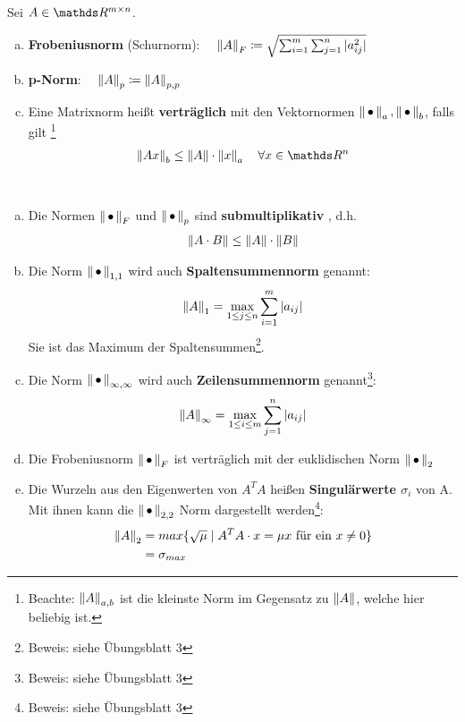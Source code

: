\begin{Defe}
  \label{3.2.5}
  Sei $A\in \R^{m\times n}$.
  \begin{enumerate}[a)]
  \item \textbf{Frobeniusnorm} (Schurnorm):
    $ \quad \nn[A]_F \coloneqq \sqrt{\sum_{i=1}^{m}\sum_{j=1}^{n}|a_{ij}^2|}
    \index{Norm!Frobeniusnorm}$
  \item \textbf{p-Norm}: 
    $\quad \nn[A]_p \coloneqq \nn[A]_{p,p}
    \index{p-Norm}$
  \item Eine Matrixnorm heißt \textbf{verträglich}  mit den Vektornormen 
    $\nn_a, \nn_b$, falls gilt
    \footnote{ Beachte: $\nn[A]_{a,b}$ ist die kleinste Norm im Gegensatz zu $\nn[A]$, welche hier beliebig ist.}
    \begin{gather*}
      \nn[Ax]_b \leq \nn[A]\cdot \nn[x]_a \quad \forall x\in \R^n
    \end{gather*}
  \end{enumerate}
\end{Defe}
\begin{Beme}~
  \label{3.2.6}
  \begin{enumerate}[a)]
  \item Die Normen $\nn_F$ und $\nn_p$ sind \textbf{submultiplikativ} , d.h.
    \begin{gather*}
      \nn[A\cdot B] \leq \nn[A]\cdot\nn[B]
    \end{gather*}
  \item Die Norm $\nn_{1,1}$ wird auch \textbf{Spaltensummennorm} genannt:
    \begin{gather*}
      \nn[A]_1 = \max_{1\leq j \leq n}\sum_{i=1}^{m}|a_{ij}|
    \end{gather*}
    Sie ist das Maximum der Spaltensummen\footnote{Beweis: siehe Übungsblatt 3}.
  \item Die Norm $\nn_{\infty, \infty}$ wird auch \textbf{Zeilensummennorm} 
    genannt\footnote{Beweis: siehe Übungsblatt 3}:
    \begin{gather*}
      \nn[A]_\infty = \max_{1\leq i \leq m}\sum_{j=1}^{n}|a_{ij}|
    \end{gather*}
  \item Die Frobeniusnorm $\nn_F$ ist verträglich mit der euklidischen Norm $\nn_2$
  \item Die Wurzeln aus den Eigenwerten von $A^TA$ heißen \textbf{Singulärwerte $\sigma_i$}  von A.
    Mit ihnen kann die $\nn_{2,2}$ Norm dargestellt werden\footnote{Beweis: siehe Übungsblatt 3}:
    \begin{align*}
      \nn[A]_2 &= max \{\sqrt{\mu} \mid A^TA\cdot x = \mu x\text{ für ein }x\neq 0 \} \\
               & = \sigma_{max}
    \end{align*}
  \end{enumerate}
\end{Beme}


